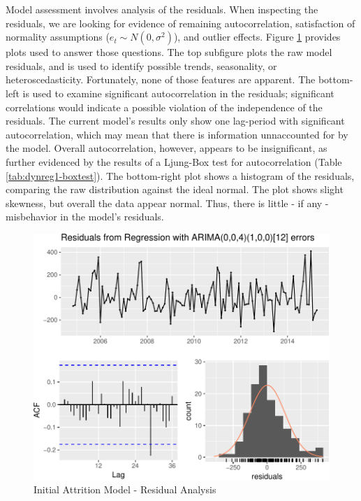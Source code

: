 \documentclass[12pt,letterpaper,toc=flat,oneside]{report}
\theoremstyle{definition}
\theoremstyle{definition}
\theoremstyle{definition}
\theoremstyle{remark}
\begin{document}
Model assessment involves analysis of the residuals. When inspecting the
residuals, we are looking for evidence of remaining autocorrelation,
satisfaction of normality assumptions (\(e_t \sim N(0,\sigma^2)\)), and
outlier effects. Figure \ref{fig:dynreg1-resid} provides plots used to
answer those questions. The top subfigure plots the raw model residuals,
and is used to identify possible trends, seasonality, or
heteroscedasticity. Fortunately, none of those features are apparent.
The bottom-left is used to examine significant autocorrelation in the
residuals; significant correlations would indicate a possible violation
of the independence of the residuals. The current model's results only
show one lag-period with significant autocorrelation, which may mean
that there is information unnaccounted for by the model. Overall
autocorrelation, however, appears to be insignificant, as further
evidenced by the results of a Ljung-Box test for autocorrelation (Table
\ref{tab:dynreg1-boxtest}). The bottom-right plot shows a histogram of
the residuals, comparing the raw distribution against the ideal normal.
The plot shows slight skewness, but overall the data appear normal.
Thus, there is little - if any - misbehavior in the model's residuals.

\begin{figure}[H]

{\centering \includegraphics{elliott-econometric-personnel-retention-18_files/figure-latex/dynreg1-resid-1} 

}

\caption{Initial Attrition Model - Residual Analysis}\label{fig:dynreg1-resid}
\end{figure}
\end{document}
